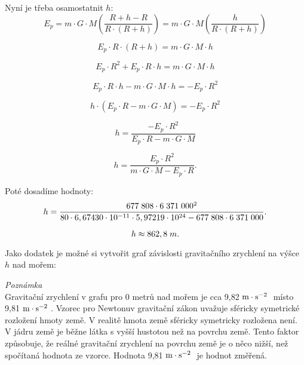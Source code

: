 \documentclass{article}
\begin{document}
Nyní je třeba osamostatnit $h$:
$$
    E_p = m \cdot G \cdot M \left( \frac{R + h - R}{R \cdot (R + h)} \right) = m \cdot G \cdot M \left( \frac{h}{R \cdot (R + h)} \right)
$$

$$
    E_p \cdot R \cdot (R + h) = m \cdot G \cdot M \cdot h
$$

$$
    E_p \cdot R^2 + E_p \cdot R \cdot h = m \cdot G \cdot M \cdot h
$$

$$
    E_p \cdot R \cdot h - m \cdot G \cdot M \cdot h = - E_p \cdot R^2
$$

$$
    h \cdot (E_p \cdot R - m \cdot G \cdot M) = - E_p \cdot R^2
$$

$$
    h = \frac{- E_p \cdot R^2}{E_p \cdot R - m \cdot G \cdot M}
$$

$$
    h = \frac{E_p \cdot R^2}{m \cdot G \cdot M - E_p \cdot R}.
$$

Poté dosadíme hodnoty:
$$
    h = \frac{677 \; 808 \cdot 6 \; 371 \; 000^2}{80 \cdot 6,67430 \cdot 10^{-11} \cdot 5,97219 \cdot 10^{24} - 677 \; 808 \cdot 6 \; 371 \; 000}.
$$

$$
    h \approx 862,8 \; m.
$$

Jako dodatek je možné si vytvořit graf závislosti gravitačního zrychlení na výšce $h$ nad mořem:

\begin{center}
\end{center}

\textit{Poznámka}\\

Gravitační zrychlení v grafu pro 0 metrů nad mořem je cca 9,82 $\textrm{m} \cdot \textrm{s}^{-2} \;$ místo 9,81 $\textrm{m} \cdot \textrm{s}^{-2} \;$. Vzorec pro Newtonuv gravitační zákon uvažuje sféricky symetrické rozložení hmoty země. V realitě hmota země sféricky symetricky rozložena není. V jádru země je běžne látka s vyšší hustotou než na povrchu země. Tento faktor způsobuje, že reálné gravitační zrychlení na povrchu země je o něco nižší, než spočítaná hodnota ze vzorce. Hodnota 9,81 $\textrm{m} \cdot \textrm{s}^{-2} \;$ je hodnot změřená.
\end{document}
